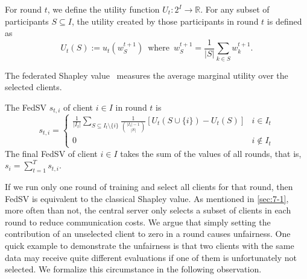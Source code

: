 For round $t $, we define the utility function $U_t : 2^{I} \to \mathbb{R}$. For any subset of participants $S \subseteq I$, the utility created by those participants in round $t$ is defined as
\[U_t(S) := u_t(w_S^{t+1})  \enspace\text{where}\enspace w_S^{t+1} = \frac{1}{|S|}\sum_{k\in S} w_k^{t+1}.\]

The federated Shapley value~\citep{wang2020principled} measures the average marginal utility over the selected clients. 
\begin{definition} \label{def:federated_sv}
    The FedSV $s_{t, i}$ of client $i \in I$ in round $t$ is 
    \begin{equation*}
    s_{t, i} = 
        \begin{cases} 
      \frac{1}{|I_t|} \sum\limits_{S \subseteq I_t \setminus\{i\}} \frac{1}{\binom{|I_t|-1}{|S|}} \left[U_t(S\cup\{i\}) - U_t(S)\right] & i \in I_t \\
      0 & i \notin I_t 
   \end{cases}
    \end{equation*}
    The final FedSV of client $i \in I$ takes the sum of the values of all rounds, that is, 
   $s_i = \sum_{t=1}^T s_{t, i}$.
\end{definition}

If we run only one round of training and select all clients for that round, then FedSV is equivalent to the classical Shapley value.  As mentioned in \autoref{sec:7-1}, more often than not, the central server only selects a subset of clients in each round to reduce communication costs. We argue that simply setting the contribution of an unselected client to zero in a round causes unfairness. One quick example to demonstrate the unfairness is that two clients with the same data may receive quite different evaluations if one of them is unfortunately not selected. We formalize this circumstance in the following observation. 

